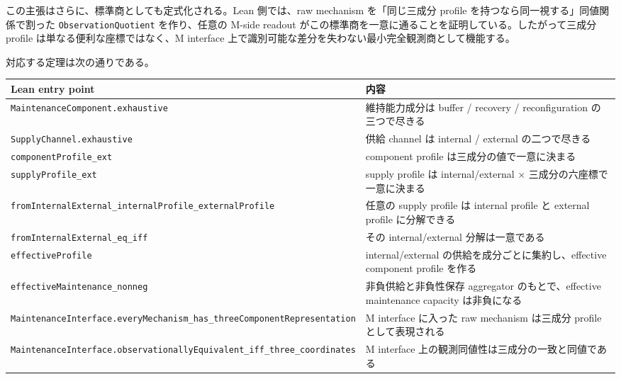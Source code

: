 \documentclass[12pt,a4paper]{article}
\begin{document}
この主張はさらに、標準商としても定式化される。Lean 側では、raw mechanism を「同じ三成分 profile を持つなら同一視する」同値関係で割った \texttt{ObservationQuotient} を作り、任意の M-side readout がこの標準商を一意に通ることを証明している。したがって三成分 profile は単なる便利な座標ではなく、M interface 上で識別可能な差分を失わない最小完全観測商として機能する。

対応する定理は次の通りである。

{\def\LTcaptype{table} %
\begin{longtable}[]{@{}
  >{\raggedright\arraybackslash}p{}
  >{\raggedright\arraybackslash}p{}@{}}
\toprule\noalign{}
\begin{minipage}[b]{\linewidth}\raggedright
Lean entry point
\end{minipage} & \begin{minipage}[b]{\linewidth}\raggedright
内容
\end{minipage} \\
\midrule\noalign{}
\endhead
\bottomrule\noalign{}
\endlastfoot
\texttt{MaintenanceComponent.exhaustive} & 維持能力成分は buffer / recovery / reconfiguration の三つで尽きる \\
\texttt{SupplyChannel.exhaustive} & 供給 channel は internal / external の二つで尽きる \\
\texttt{componentProfile\_ext} & component profile は三成分の値で一意に決まる \\
\texttt{supplyProfile\_ext} & supply profile は internal/external × 三成分の六座標で一意に決まる \\
\texttt{fromInternalExternal\_internalProfile\_externalProfile} & 任意の supply profile は internal profile と external profile に分解できる \\
\texttt{fromInternalExternal\_eq\_iff} & その internal/external 分解は一意である \\
\texttt{effectiveProfile} & internal/external の供給を成分ごとに集約し、effective component profile を作る \\
\texttt{effectiveMaintenance\_nonneg} & 非負供給と非負性保存 aggregator のもとで、effective maintenance capacity は非負になる \\
\texttt{MaintenanceInterface.everyMechanism\_has\_threeComponentRepresentation} & M interface に入った raw mechanism は三成分 profile として表現される \\
\texttt{MaintenanceInterface.observationallyEquivalent\_iff\_three\_coordinates} & M interface 上の観測同値性は三成分の一致と同値である \\

\end{longtable}}
\end{document}
